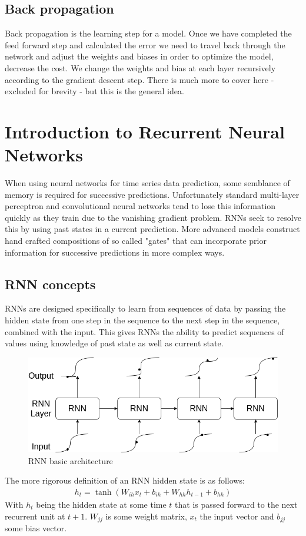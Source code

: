 \documentclass{article}
\begin{document}
\subsection{Back propagation}
\label{sec:back}
Back propagation is the learning step for a model. Once we have completed the feed forward step and calculated the error we need to travel back through the network and adjust the weights and biases in order to optimize the model, decrease the cost. We change the weights and bias at each layer recursively according to the gradient descent step.  There is much more to cover here - excluded for brevity - but this is the general idea. 
\section{Introduction to Recurrent Neural Networks}
\label{sec:intoRNNs}
When using neural networks for time series data prediction, some semblance of memory is required for successive predictions. Unfortunately standard multi-layer perceptron and convolutional neural networks tend to lose this information quickly as they train due to the vanishing gradient problem. RNNs seek to resolve this by using past states in a current prediction. More advanced models construct hand crafted compositions of so called "gates" that can incorporate prior information for successive predictions in more complex ways. 

\subsection{RNN concepts}
\label{sec:RNNS}
RNNs are designed specifically to learn from sequences of data by passing the hidden state from one step in the sequence to the next step in the sequence, combined with the input. This gives RNNs the ability to predict sequences of values using knowledge of past state as well as current state. 
\begin{figure}[H]
\centering
\caption{RNN basic architecture}
\label{fig:RNN}
\includegraphics[scale=0.5]{RNN.png}
\end{figure}
The more rigorous definition of an RNN hidden state is as follows:
\begin{align*}
h_t = \tanh\left( W_{ih}x_t + b_{ih} + W_{hh}h_{t-1} + b_{hh}  \right)
\end{align*}
With $h_t$ being the hidden state at some time $t$ that is passed forward to the next recurrent unit at $t+1$. $W_{jj}$ is some weight matrix, $x_t$ the input vector and $b_{jj}$ some bias vector. \\
\end{document}
